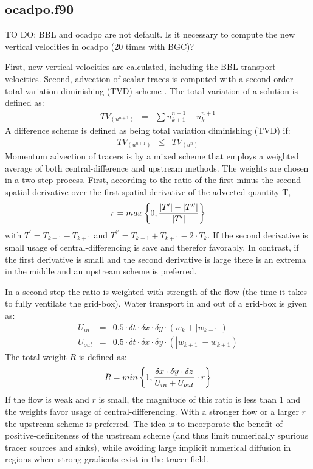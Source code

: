 \subsection{ocadpo.f90}
\label{ch:timestepping:ocadpo}
TO DO: BBL and ocadpo are not default. Is it necessary to 
compute the new vertical velocities in ocadpo (20 times with BGC)? 

First, new vertical velocities are calculated, including the BBL transport velocities.
Second, advection of scalar traces is computed with a second order total variation 
diminishing (TVD) scheme \citep{Sweby:1984}.
The total variation of a solution is defined as:
\begin{eqnarray}
TV_{(u^{n+1})}&=&\sum{u^{n+1}_{k+1}-u^{n+1}_{k}}
\end{eqnarray}
A difference scheme is defined as being total variation 
diminishing (TVD) if:
\begin{eqnarray}
TV_{(u^{n+1})}&\le&TV_{(u^{n})}
\end{eqnarray}
Momentum advection of tracers is by a mixed scheme that
employs a weighted average of both central-difference and upstream methods.
The weights are chosen in a two step process. First, according to the 
ratio of the first minus the second spatial derivative
over the first spatial derivative of the advected quantity T,
\begin{eqnarray}
r=max\left\{0,{|T^{\prime}|-|T^{\prime\prime}| \over |T^{\prime}|}\right\}
\end{eqnarray}
with $T^{\prime}=T_{k-1}-T_{k+1}$ and $T^{\prime\prime}=T_{k-1}+T_{k+1}-2\cdot T_{k}$.
If the second derivative is small usage of central-differencing is save and therefor favorably.
In contrast, if the first derivative is small and the second derivative is large there
is an extrema in the middle and an upstream scheme is preferred.

In a second step the ratio is weighted with strength of the flow
(the time it takes to fully ventilate the grid-box). 
Water transport in and out of a grid-box is given as:
\begin{eqnarray}
U_{in}&=&0.5\cdot\delta t \cdot\delta x \cdot\delta y \cdot(w_k +|w_{k-1}|) \nonumber \\
U_{out}&=&0.5\cdot\delta t \cdot\delta x \cdot\delta y \cdot(|w_{k+1}|-w_{k+1})
\end{eqnarray}
The total weight $R$ is defined as:
\begin{eqnarray}
R=min\left\{1,{\delta x \cdot\delta y \cdot\delta z \over U_{in}+U_{out}}\cdot r\right\}
\end{eqnarray}
If the flow is weak and $r$ is small, the magnitude of this ratio 
is less than 1 and the weights favor usage of central-differencing.
With a stronger flow or a larger $r$ the upstream scheme is preferred.
The idea is to incorporate the benefit of positive-definiteness of the upstream scheme
(and thus limit numerically spurious tracer sources and sinks),
while avoiding large implicit numerical diffusion in regions where strong gradients
exist in the tracer field.

